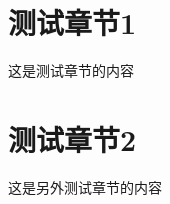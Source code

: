 \documentclass{si_template/cn_book}
\begin{document}
\frontmatter
\mainmatter

\chapter{测试章节1}

这是测试章节的内容

\chapter{测试章节2}

这是另外测试章节的内容

\backmatter
\end{document}
